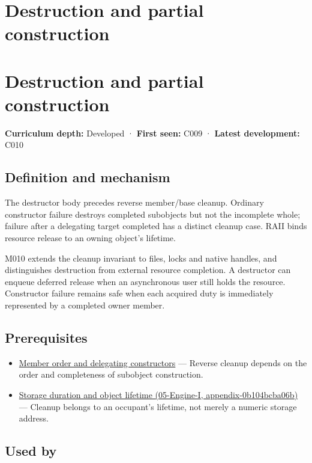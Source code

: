 \hypertarget{appendix-9bfe377cef7a}{}
\section*{Destruction and partial construction}
\section{Destruction and partial construction}\label{destruction-and-partial-construction}

\textbf{Curriculum depth:} Developed · \textbf{First seen:} C009 · \textbf{Latest development:} C010

\subsection{Definition and mechanism}\label{definition-and-mechanism}

The destructor body precedes reverse member/base cleanup. Ordinary constructor failure destroys completed subobjects but not the incomplete whole; failure after a delegating target completed has a distinct cleanup case. RAII binds resource release to an owning object's lifetime.

M010 extends the cleanup invariant to files, locks and native handles, and distinguishes destruction from external resource completion. A destructor can enqueue deferred release when an asynchronous user still holds the resource. Constructor failure remains safe when each acquired duty is immediately represented by a completed owner member.

\subsection{Prerequisites}\label{prerequisites}

\begin{itemize}
\tightlist
\item
  \hyperref[appendix-3cb49709605a]{Member order and delegating constructors} --- Reverse cleanup depends on the order and completeness of subobject construction.
\item
  \href{}{Storage duration and object lifetime (05-Engine-I, appendix-0b104bcba06b)} --- Cleanup belongs to an occupant's lifetime, not merely a numeric storage address.
\end{itemize}

\subsection{Used by}\label{used-by}


